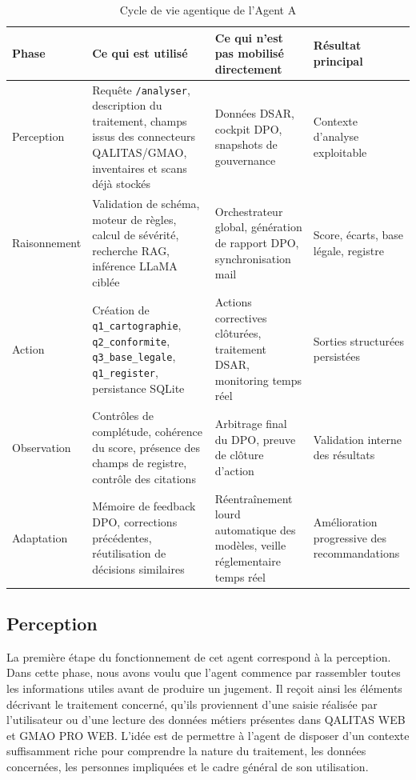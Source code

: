 \documentclass[12pt,a4paper]{report}
\begin{document}
\begin{table}[H]
\centering
\caption{Cycle de vie agentique de l'Agent A}
\label{tab:cycle_agent_a}
\begin{tabularx}{\textwidth}{|p{2.2cm}|X|X|X|}
\hline
\textbf{Phase} & \textbf{Ce qui est utilisé} & \textbf{Ce qui n'est pas mobilisé directement} & \textbf{Résultat principal} \\
\hline
Perception & Requête \texttt{/analyser}, description du traitement, champs issus des connecteurs QALITAS/GMAO, inventaires et scans déjà stockés & Données DSAR, cockpit DPO, snapshots de gouvernance & Contexte d'analyse exploitable \\
\hline
Raisonnement & Validation de schéma, moteur de règles, calcul de sévérité, recherche RAG, inférence LLaMA ciblée & Orchestrateur global, génération de rapport DPO, synchronisation mail & Score, écarts, base légale, registre \\
\hline
Action & Création de \texttt{q1\_cartographie}, \texttt{q2\_conformite}, \texttt{q3\_base\_legale}, \texttt{q1\_register}, persistance SQLite & Actions correctives clôturées, traitement DSAR, monitoring temps réel & Sorties structurées persistées \\
\hline
Observation & Contrôles de complétude, cohérence du score, présence des champs de registre, contrôle des citations & Arbitrage final du DPO, preuve de clôture d'action & Validation interne des résultats \\
\hline
Adaptation & Mémoire de feedback DPO, corrections précédentes, réutilisation de décisions similaires & Réentraînement lourd automatique des modèles, veille réglementaire temps réel & Amélioration progressive des recommandations \\
\hline
\end{tabularx}
\end{table}

\subsection{Perception}

La première étape du fonctionnement de cet agent correspond à la perception. Dans cette phase, nous avons voulu que l'agent commence par rassembler toutes les informations utiles avant de produire un jugement. Il reçoit ainsi les éléments décrivant le traitement concerné, qu'ils proviennent d'une saisie réalisée par l'utilisateur ou d'une lecture des données métiers présentes dans QALITAS WEB et GMAO PRO WEB. L'idée est de permettre à l'agent de disposer d'un contexte suffisamment riche pour comprendre la nature du traitement, les données concernées, les personnes impliquées et le cadre général de son utilisation.
\end{document}
